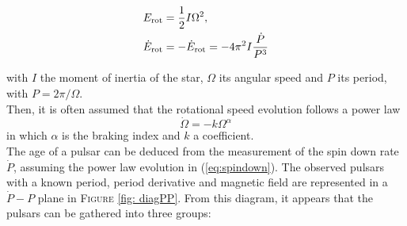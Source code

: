 \documentclass[a4paper, twoside, 12pt]{article}
\numberwithin{equation}{section}
\begin{document}
\begin{align}
\begin{split}
E_{\rm{rot}} &= \frac{1}{2} I \Omega^2, \\
\dot{E}_{\rm{rot}} &= - \dot{E}_{\rm{rot}}=-4 \pi^2 I \frac{\dot{P}}{P^3}\\
\label{eq:spin_down_law}
\end{split} 
\end{align}

\noindent with $I$ the moment of inertia of the star, $\Omega$ its angular speed and $P$ its period, with $P=2\pi/\Omega$. \\
Then, it is often assumed that the rotational speed evolution follows a power law 
\begin{equation}
\dot{\Omega} = - k \Omega^{\alpha}
\label{eq:spindown}
\end{equation} 
in which $\alpha$ is the  braking index and $k$ a coefficient. \\ The age of a pulsar can be deduced from the measurement of the spin down rate $\dot{P}$, assuming the power law evolution in (\ref{eq:spindown}). The observed pulsars with a known period,  period derivative and  magnetic field are represented in a $\dot{P}-P$ plane in F\textsc{igure} \ref{fig: diagPP}. From this diagram, it appears that the pulsars can be gathered into three groups: 
\end{document}
